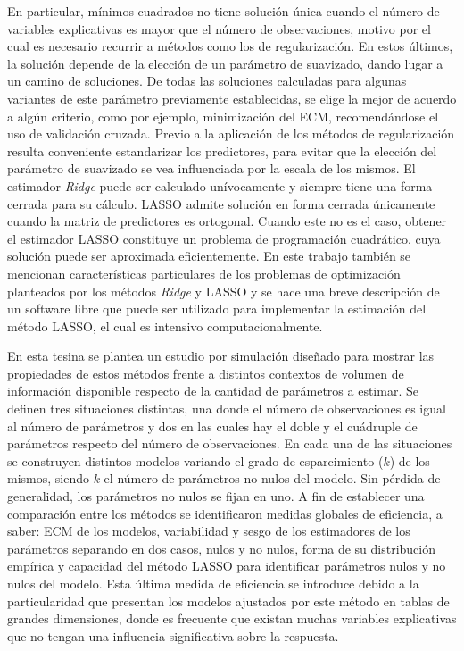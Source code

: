 \documentclass[a4paper,12pt]{report}
\begin{document}
En particular, mínimos cuadrados no tiene solución única cuando el número de variables explicativas es mayor que el número de observaciones, motivo por el cual es necesario recurrir a métodos como los de regularización. En estos últimos, la solución depende de la elección de un parámetro de suavizado, dando lugar a un camino de soluciones. De todas las soluciones calculadas para algunas variantes de este parámetro previamente establecidas, se elige la mejor de acuerdo a algún criterio, como por ejemplo, minimización del ECM, recomendándose el uso de validación cruzada. Previo a la aplicación de los métodos de regularización resulta conveniente estandarizar los predictores, para evitar que la elección del parámetro de suavizado se vea influenciada por la escala de los mismos. El estimador \textit{Ridge} puede ser calculado unívocamente y siempre tiene una forma cerrada para su cálculo. LASSO admite solución en forma cerrada únicamente cuando la matriz de predictores es ortogonal. Cuando este no es el caso, obtener el estimador LASSO constituye un problema de programación cuadrático, cuya solución puede ser aproximada eficientemente. En este trabajo también se mencionan características particulares de los problemas de optimización planteados por los métodos \textit{Ridge} y LASSO y se hace una breve descripción de un software libre que puede ser utilizado para implementar la estimación del método LASSO, el cual es intensivo computacionalmente.

En esta tesina se plantea un estudio por simulación diseñado para mostrar las propiedades de estos métodos frente a distintos contextos de volumen de información disponible respecto de la cantidad de parámetros a estimar. Se definen tres situaciones distintas, una donde el número de observaciones es igual al número de parámetros y dos en las cuales hay el doble y el cuádruple de parámetros respecto del número de observaciones. En cada una de las situaciones se construyen distintos modelos variando el grado de esparcimiento ($k$) de los mismos, siendo $k$ el número de parámetros no nulos del modelo. Sin pérdida de generalidad, los parámetros no nulos se fijan en uno. A fin de establecer una comparación entre los métodos se identificaron medidas globales de eficiencia, a saber: ECM de los modelos, variabilidad y sesgo de los estimadores de los parámetros separando en dos casos, nulos y no nulos, forma de su distribución empírica y capacidad del método LASSO para identificar parámetros nulos y no nulos del modelo. Esta última medida de eficiencia se introduce debido a la particularidad que presentan los modelos ajustados por este método en tablas de grandes dimensiones, donde es frecuente que existan muchas variables explicativas que no tengan una influencia significativa sobre la respuesta.
\end{document}
